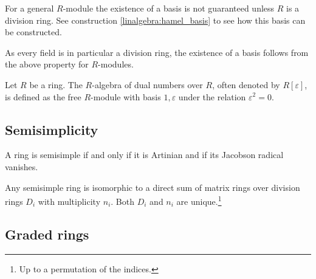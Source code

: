 	\begin{property}\label{algebra:module_basis}
		For a general $R$-module the existence of a basis is not guaranteed unless $R$ is a division ring. See construction \ref{linalgebra:hamel_basis} to see how this basis can be constructed.
	\end{property}
	\begin{result}
		As every field is in particular a division ring, the existence of a basis follows from the above property for $R$-modules.
	\end{result}
	
	
	\begin{example}
		Let $R$ be a ring. The $R$-algebra of dual numbers over $R$, often denoted by $R[\varepsilon]$, is defined as the free $R$-module with basis ${1, \varepsilon}$ under the relation $\varepsilon^2 = 0$.
	\end{example}

\subsection{Semisimplicity}

	\begin{theorem}
		A ring is semisimple if and only if it is Artinian and if its Jacobson radical vanishes.
	\end{theorem}
	
	\begin{theorem}
		Any semisimple ring is isomorphic to a direct sum of matrix rings over division rings $D_i$ with multiplicity $n_i$. Both $D_i$ and $n_i$ are unique.\footnote{Up to a permutation of the indices.}
	\end{theorem}

\subsection{Graded rings}
	
